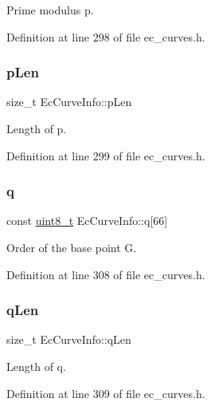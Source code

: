 Prime modulus p. 



Definition at line 298 of file ec\+\_\+curves.\+h.

\mbox{\label{structEcCurveInfo_ab2badb15f033fc37e697df9247635126}} 
\subsubsection{\texorpdfstring{p\+Len}{pLen}}
{\footnotesize\ttfamily size\+\_\+t Ec\+Curve\+Info\+::p\+Len}



Length of p. 



Definition at line 299 of file ec\+\_\+curves.\+h.

\mbox{\label{structEcCurveInfo_a96cbcc6f7b443a7861db66ab2fdddd9b}} 
\subsubsection{\texorpdfstring{q}{q}}
{\footnotesize\ttfamily const \hyperlink{stdint_8h_aba7bc1797add20fe3efdf37ced1182c5}{uint8\+\_\+t} Ec\+Curve\+Info\+::q\mbox{[}66\mbox{]}}



Order of the base point G. 



Definition at line 308 of file ec\+\_\+curves.\+h.

\mbox{\label{structEcCurveInfo_a262db34150bfda44566a0e8c87ca80c5}} 
\subsubsection{\texorpdfstring{q\+Len}{qLen}}
{\footnotesize\ttfamily size\+\_\+t Ec\+Curve\+Info\+::q\+Len}



Length of q. 



Definition at line 309 of file ec\+\_\+curves.\+h.

